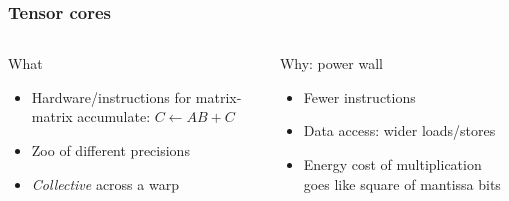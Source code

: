 \documentclass[aspectratio=169]{beamer}
\begin{document}

\begin{frame}
  \frametitle{Tensor cores}
  \begin{columns}[t]
    \begin{column}{0.5\textwidth}
      \begin{block}{What}
        \begin{itemize}
        \item Hardware/instructions for matrix-matrix accumulate: $C \gets A B + C$
        \item Zoo of different precisions
        \item \emph{Collective} across a warp
        \end{itemize}
      \end{block}
    \end{column}
    \begin{column}{0.5\textwidth}
      \begin{block}{Why: power wall}
        \begin{itemize}
        \item Fewer instructions
        \item Data access: wider loads/stores
        \item Energy cost of multiplication goes like
          square of mantissa bits
        \end{itemize}
      \end{block}
    \end{column}
  \end{columns}
\end{frame}
\end{document}
